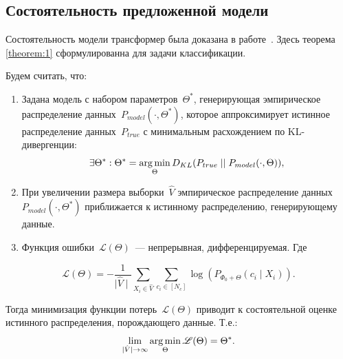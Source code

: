 \subsection{Состоятельность предложенной модели}
Состоятельность модели трансформер была доказана в работе~\cite{lee2023mathematical}. Здесь теорема \ref{theorem:1} сформулированна для задачи классификации.
\begin{theorem}
\label{theorem:1}
Будем считать, что: 
\begin{enumerate}
    \item Задана модель с набором параметров~$\Theta^*$, генерирующая эмпирическое распределение данных~$P_{model}(\cdot, \Theta^*)$, которое аппроксимирует истинное распределение данных~$P_{true}$ с минимальным расхождением по KL-дивергенции: 
    \begin{equation}
    \label{eq:1}
    \exists \Theta^*: \Theta^* = \operatorname*{arg\,min} _\Theta D_{KL}(P_{true} \mid\mid P_{model}(\cdot, \Theta)),
    \end{equation}
     \item При увеличении размера выборки~$\hat{V}$ эмпирическое распределение данных $P_{model}(\cdot, \Theta^*)$ приближается к истинному распределению, генерирующему данные.
     \item Функция ошибки~$\mathscr{L}(\Theta)$~--- непрерывная, дифференцируемая. Где
\end{enumerate}
\begin{equation}
\label{eq:2.1}
\mathscr{L}(\Theta) = -\frac{1}{\mid \hat{V} \mid} \sum_{X_i \in \hat{V}} \sum_{c_i \in [N_c]} \log \left(P_{\Phi_0+\Theta}\left(c_i \mid X_i\right)\right).
\end{equation}

Тогда минимизация функции потерь~$\mathscr{L}(\Theta)$ приводит к состоятельной оценке истинного распределения, порождающего данные. Т.е.: 
\begin{equation}
\label{eq:2.2}
    \lim_{\mid\hat{V}\mid\to\infty} \operatorname*{arg\,min} _\Theta \mathscr{L}(\Theta) = \Theta^*.
\end{equation}

\end{theorem}
\renewcommand\qedsymbol{$\blacksquare$}
